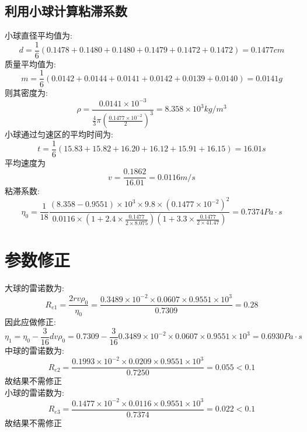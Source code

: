 \documentclass[12pt,a4paper,oneside]{ctexart}
\begin{document}
\subsection{利用小球计算粘滞系数}
\noindent
小球直径平均值为:
$$d=\frac{1}{6}(0.1478+0.1480+0.1480+0.1479+0.1472+0.1472)=0.1477cm$$
质量平均值为:
$$m=\frac{1}{6}(0.0142+0.0144+0.0141+0.0142+0.0139+0.0140)=0.0141g$$
则其密度为:
$$\rho=\dfrac{0.0141\times10^{-3}}{\frac{4}{3}\pi(\frac{0.1477\times10^{-2}}{2})^3}=8.358\times10^3kg/m^3$$
小球通过匀速区的平均时间为:
$$t=\frac{1}{6}(15.83+15.82+16.20+16.12+15.91+16.15)=16.01s$$
平均速度为$$v=\dfrac{0.1862}{16.01}=0.0116m/s$$
粘滞系数:
\begin{equation*}
    \eta_0=\frac{1}{18}\frac{(8.358-0.9551)\times10^3\times9.8\times(0.1477\times10^{-2})^2}
    {0.0116\times(1+2.4\times\frac{0.1477}{2\times8.075})(1+3.3\times\frac{0.1477}{2\times41.47})}=0.7374Pa\cdot s
\end{equation*}
\section{参数修正}
\noindent
大球的雷诺数为:
\begin{equation*}
    R_{e1}=\dfrac{2rv\rho_0}{\eta_0}=\dfrac{0.3489\times10^{-2}\times0.0607\times0.9551\times10^3}{0.7309}=0.28
\end{equation*}
因此应做修正:
$$\eta_1=\eta_0-\frac{3}{16}dv\rho_0=0.7309-\frac{3}{16}0.3489\times10^{-2}\times0.0607\times0.9551\times10^3=0.6930Pa\cdot s$$
中球的雷诺数为:
$$R_{e2}=\dfrac{0.1993\times10^{-2}\times0.0209\times0.9551\times10^3}{0.7250}=0.055<0.1$$
故结果不需修正\\
小球的雷诺数为:
$$R_{e3}=\dfrac{0.1477\times10^{-2}\times0.0116\times0.9551\times10^3}{0.7374}=0.022<0.1$$
故结果不需修正
\end{document}
